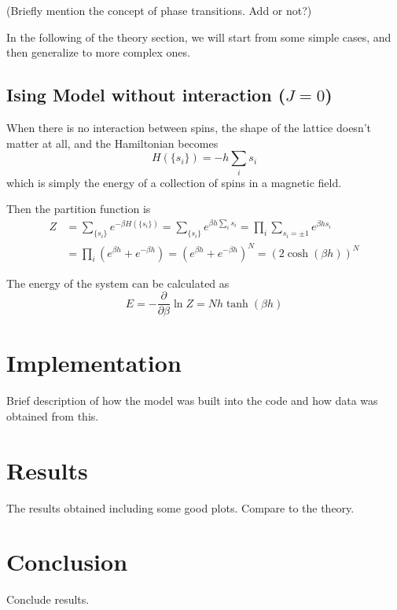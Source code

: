 \documentclass[11pt]{article}
\begin{document}
	(Briefly mention the concept of phase transitions. Add or not?)

	In the following of the theory section, we will start from some simple cases, and then generalize to more complex ones.

	\subsection{Ising Model without interaction ($J=0$)}

	When there is no interaction between spins, the shape of the lattice doesn't matter at all, and the Hamiltonian becomes
	\begin{equation}
		H(\{s_i\}) = -h \sum_i s_i
	\end{equation}
	which is simply the energy of a collection of spins in a magnetic field.

	Then the partition function is
	\begin{equation}
		\begin{aligned}
			Z &= \sum_{\{s_i\}} e^{-\beta H(\{s_i\})} = \sum_{\{s_i\}} e^{\beta h \sum_i s_i} = \prod_i \sum_{s_i=\pm1} e^{\beta h s_i} \\
			&= \prod_i (e^{\beta h} + e^{-\beta h}) = (e^{\beta h} + e^{-\beta h})^N = (2\cosh(\beta h))^N
		\end{aligned}
	\end{equation}

	The energy of the system can be calculated as
	\begin{equation}
		E = -\frac{\partial}{\partial \beta} \ln Z = N h \tanh(\beta h)
	\end{equation}
	
	\section{Implementation}
	
	Brief description of how the model was built into the code and how data was obtained from this.
	
	\section{Results}
	
	The results obtained including some good plots. Compare to the theory.
	
	\section{Conclusion}
	
	Conclude results.
	
\end{document}
